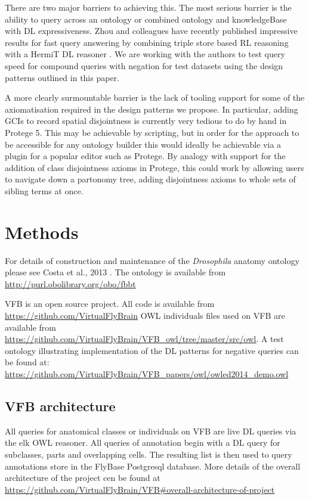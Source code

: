 \documentclass[runningheads,a4paper]{llncs}
\begin{document}
There are two major barriers to achieving this. The most serious
barrier is the ability to query across an ontology or combined ontology and
knowledgeBase with DL expressiveness.  Zhou and colleagues have
recently published impressive results for fast query answering by
combining triple store based RL reasoning with a HermiT DL reasoner
\cite{ZNCH14a}.  We are working with the authors to test query speed
for compound queries with negation for test datasets using the design
patterns outlined in this paper.

A more clearly surmountable barrier is the lack of tooling support for
some of the axiomatisation required in the design patterns we propose.  In
particular, adding GCIs to record spatial disjointness is currently
very tedious to do by hand in Protege 5.  This may be achievable by
scripting, but in order for the approach to be accessible for any
ontology builder this would ideally be achievable via a plugin for a
popular editor such as Protege.  By analogy with support for the
addition of class disjointness axioms in Protege, this could work by allowing
users to navigate down a partonomy tree, adding disjointness axioms to
whole sets of sibling terms at once.


\section{Methods}

For details of construction and maintenance of the \textit{Drosophila}
anatomy ontology please see Costa et al., 2013 \cite{Costa2013}. The
ontology is available from \url{http://purl.obolibrary.org/obo/fbbt}

VFB is an open source project.  All code is available from
\url{https://github.com/VirtualFlyBrain}
OWL individuals files used on VFB are available from
\url{https://github.com/VirtualFlyBrain/VFB_owl/tree/master/src/owl}. A
test ontology illustrating implementation of the DL patterns for
negative queries can be found at:
\url{https://github.com/VirtualFlyBrain/VFB_papers/owl/owled2014_demo.owl}

\subsection{VFB architecture}

All queries for anatomical classes or individuals on VFB are live DL
queries via the elk OWL reasoner.  All queries of annotation begin
with a DL query for subclasses, parts and overlapping cells.  The
resulting list is then used to query annotations store in the FlyBase
Postgresql database.  More details of the overall architecture of the
project cen be found at
\url{https://github.com/VirtualFlyBrain/VFB#overall-architecture-of-project}
\end{document}
